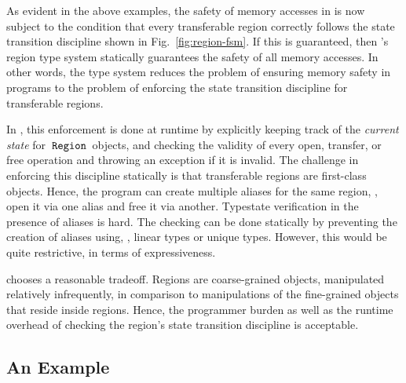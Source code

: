 
As evident in the above examples, the safety of memory accesses in
\name is now subject to the condition that every transferable region
correctly follows the state transition discipline shown
in Fig.~\ref{fig:region-fsm}. If this is
guaranteed, then \name's region type system statically guarantees the
safety of all memory accesses. In other words, the type system reduces
the problem of ensuring memory safety in \name programs to the problem
of enforcing the state transition discipline for transferable regions.

In \name, this enforcement is done at runtime by explicitly keeping
track of the \emph{current state} for $\,{\tt Region}\,$ objects, and
checking the validity of every open, transfer, or free operation
and throwing an exception if it is invalid.
The challenge in enforcing this discipline statically is that transferable regions
are first-class objects. Hence, the program can create multiple aliases for
the same region, \eg, open it via one alias and free it via another.
Typestate verification in the presence of aliases is hard.
The checking can be done statically by preventing the creation of aliases using, \eg, linear types
or unique types. However, this would be quite restrictive, in terms of expressiveness.

\name chooses a reasonable tradeoff. Regions are coarse-grained objects, manipulated relatively infrequently,
in comparison to manipulations of the fine-grained objects that reside inside regions. Hence, the programmer burden
as well as the runtime overhead of checking the region's state transition discipline is acceptable.



\subsection{An Example}

